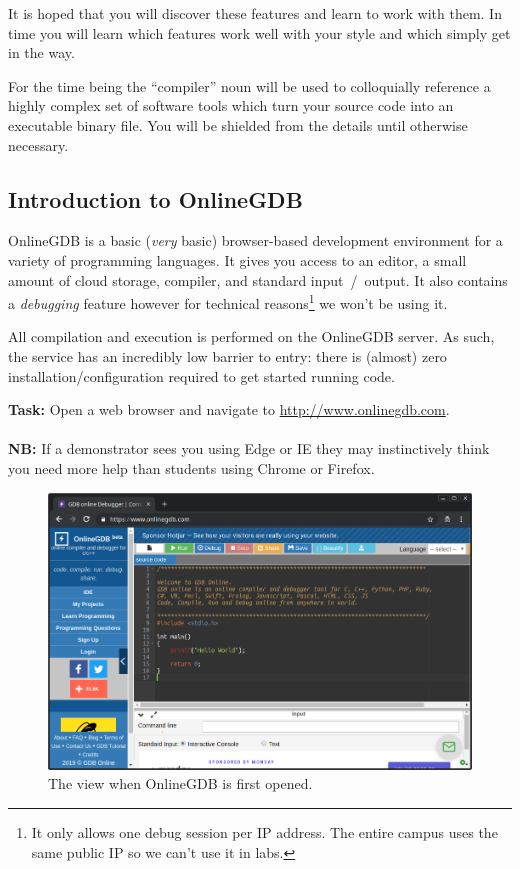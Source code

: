 \documentclass{lab}
\begin{document}
It is hoped that you will discover these features and learn to work with them. In time you will learn which features work well with your style and which simply get in the way.

For the time being the ``compiler'' noun will be used to colloquially reference a highly complex set of software tools which turn your source code into an executable binary file. You will be shielded from the details until otherwise necessary.

\subsection{Introduction to OnlineGDB}

OnlineGDB is a basic (\textit{very} basic) browser-based development environment for a variety of programming languages. It gives you access to an editor, a small amount of cloud storage, compiler, and standard input~/~output. It also contains a \textit{debugging} feature however for technical reasons\footnote{It only allows one debug session per IP address. The entire campus uses the same public IP so we can't use it in labs.} we won't be using it.

All compilation and execution is performed on the OnlineGDB server. As such, the service has an incredibly low barrier to entry: there is (almost) zero installation/configuration required to get started running code.

\textbf{Task:} Open a web browser and navigate to \url{http://www.onlinegdb.com}.\\ \\ \textbf{NB:} If a demonstrator sees you using Edge or IE they may instinctively think you need more help than students using Chrome or Firefox.

\begin{figure}[H]
\begin{center}
\includegraphics[width=\textwidth]{onlinegdb.png}
\end{center}
\caption{The view when OnlineGDB is first opened.}\label{fig:onlinegdb}
\end{figure}
\end{document}
